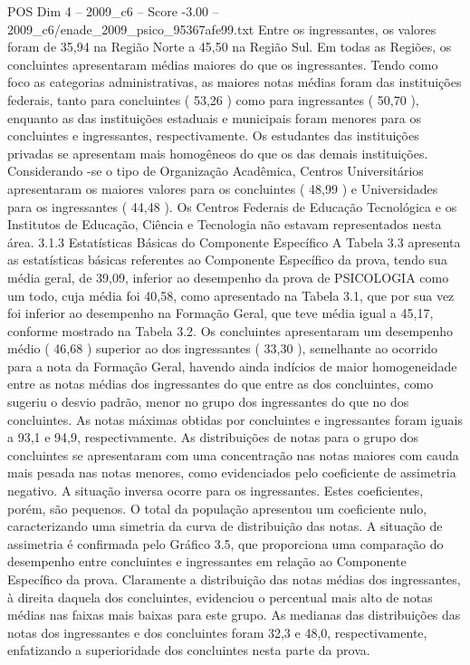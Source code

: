 \begin{textsample}{POS Dim 4 – 2009\_c6 – Score -3.00 – 2009\_c6/enade\_2009\_psico\_95367afe99.txt}
Entre os ingressantes, os valores foram de 35,94 na Região Norte a 45,50 na Região Sul.
Em todas as Regiões, os concluintes apresentaram médias maiores do que os ingressantes.
Tendo como foco as categorias administrativas, as maiores notas médias foram das instituições federais, tanto para concluintes ( 53,26 ) como para ingressantes ( 50,70 ), enquanto as das instituições estaduais e municipais foram menores para os concluintes e ingressantes, respectivamente.
Os estudantes das instituições privadas se apresentam mais homogêneos do que os das demais instituições.
Considerando -se o tipo de Organização Acadêmica, Centros Universitários apresentaram os maiores valores para os concluintes ( 48,99 ) e Universidades para os ingressantes ( 44,48 ).
Os Centros Federais de Educação Tecnológica e os Institutos de Educação, Ciência e Tecnologia não estavam representados nesta área. 3.1.3 Estatísticas Básicas do Componente Específico A Tabela 3.3 apresenta as estatísticas básicas referentes ao Componente Específico da prova, tendo sua média geral, de 39,09, inferior ao desempenho da prova de PSICOLOGIA como um todo, cuja média foi 40,58, como apresentado na Tabela 3.1, que por sua vez foi inferior ao desempenho na Formação Geral, que teve média igual a 45,17, conforme mostrado na Tabela 3.2.
Os concluintes apresentaram um desempenho médio ( 46,68 ) superior ao dos ingressantes ( 33,30 ), semelhante ao ocorrido para a nota da Formação Geral, havendo ainda indícios de maior homogeneidade entre as notas médias dos ingressantes do que entre as dos concluintes, como sugeriu o desvio padrão, menor no grupo dos ingressantes do que no dos concluintes.
As notas máximas obtidas por concluintes e ingressantes foram iguais a 93,1 e 94,9, respectivamente.
As distribuições de notas para o grupo dos concluintes se apresentaram com uma concentração nas notas maiores com cauda mais pesada nas notas menores, como evidenciados pelo coeficiente de assimetria negativo.
A situação inversa ocorre para os ingressantes.
Estes coeficientes, porém, são pequenos.
O total da população apresentou um coeficiente nulo, caracterizando uma simetria da curva de distribuição das notas.
A situação de assimetria é confirmada pelo Gráfico 3.5, que proporciona uma comparação do desempenho entre concluintes e ingressantes em relação ao Componente Específico da prova.
Claramente a distribuição das notas médias dos ingressantes, à direita daquela dos concluintes, evidenciou o percentual mais alto de notas médias nas faixas mais baixas para este grupo.
As medianas das distribuições das notas dos ingressantes e dos concluintes foram 32,3 e 48,0, respectivamente, enfatizando a superioridade dos concluintes nesta parte da prova.

\end{textsample}
